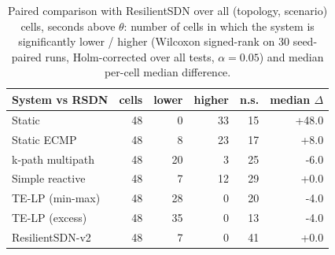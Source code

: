 \begin{table}[t]\centering\scriptsize
\caption{Paired comparison with ResilientSDN over all (topology, scenario) cells, seconds above $\theta$: number of cells in which the system is significantly lower / higher (Wilcoxon signed-rank on 30 seed-paired runs, Holm-corrected over all tests, $\alpha=0.05$) and median per-cell median difference.}\label{tab:paired_time}
\begin{tabular}{lrrrrr}
\toprule
System vs RSDN & cells & lower & higher & n.s. & median $\Delta$\\
\midrule
Static & 48 & 0 & 33 & 15 & +48.0\\
Static ECMP & 48 & 8 & 23 & 17 & +8.0\\
k-path multipath & 48 & 20 & 3 & 25 & -6.0\\
Simple reactive & 48 & 7 & 12 & 29 & +0.0\\
TE-LP (min-max) & 48 & 28 & 0 & 20 & -4.0\\
TE-LP (excess) & 48 & 35 & 0 & 13 & -4.0\\
ResilientSDN-v2 & 48 & 7 & 0 & 41 & +0.0\\
\bottomrule
\end{tabular}
\end{table}